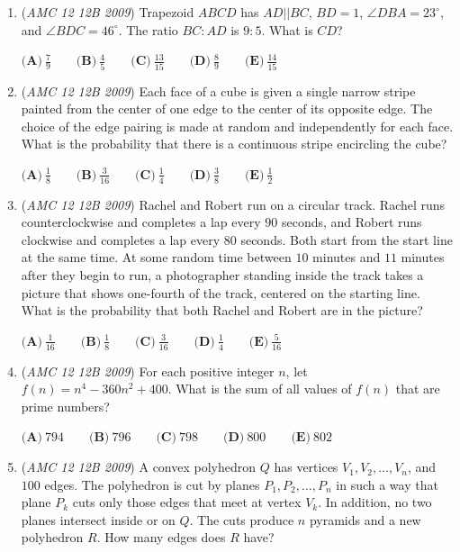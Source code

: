 \begin{enumerate}
 $\textbf{(A)}\ 3(1 + r)^x = 7\qquad \textbf{(B)}\ 3(1 + r/10)^x = 7\qquad \textbf{(C)}\ 3(1 + 2r)^x = 7$
$\textbf{(D)}\ 3(1 + \sqrt {r})^x = 7\qquad \textbf{(E)}\ 3(1 + 1/r)^x = 7$


	\item (\textit{AMC 12 12B 2009}) Trapezoid $ABCD$ has $AD||BC$, $BD = 1$, $\angle DBA = 23^{\circ}$, and $\angle BDC = 46^{\circ}$.  The ratio $BC: AD$ is $9: 5$.  What is $CD$?


 $\textbf{(A)}\ \frac {7}{9}\qquad \textbf{(B)}\ \frac {4}{5}\qquad \textbf{(C)}\ \frac {13}{15} \qquad \textbf{(D)}\ \frac {8}{9}\qquad \textbf{(E)}\ \frac {14}{15}$


	\item (\textit{AMC 12 12B 2009}) Each face of a cube is given a single narrow stripe painted from the center of one edge to the center of its opposite edge.  The choice of the edge pairing is made at random and independently for each face.  What is the probability that there is a continuous stripe encircling the cube?


 $\textbf{(A)}\ \frac {1}{8}\qquad \textbf{(B)}\ \frac {3}{16}\qquad \textbf{(C)}\ \frac {1}{4} \qquad \textbf{(D)}\ \frac {3}{8}\qquad \textbf{(E)}\ \frac {1}{2}$


	\item (\textit{AMC 12 12B 2009}) Rachel and Robert run on a circular track. Rachel runs counterclockwise and completes a lap every $90$ seconds, and Robert runs clockwise and completes a lap every $80$ seconds. Both start from the start line at the same time. At some random time between $10$ minutes and $11$ minutes after they begin to run, a photographer standing inside the track takes a picture that shows one-fourth of the track, centered on the starting line. What is the probability that both Rachel and Robert are in the picture?


 $\textbf{(A)}\ \frac {1}{16}\qquad \textbf{(B)}\ \frac18\qquad \textbf{(C)}\ \frac {3}{16} \qquad \textbf{(D)}\ \frac14\qquad \textbf{(E)}\ \frac {5}{16}$


	\item (\textit{AMC 12 12B 2009}) For each positive integer $n$, let $f(n) = n^4 - 360n^2 + 400$. What is the sum of all values of $f(n)$ that are prime numbers?


 $\textbf{(A)}\ 794\qquad \textbf{(B)}\ 796\qquad \textbf{(C)}\ 798\qquad \textbf{(D)}\ 800\qquad \textbf{(E)}\ 802$


	\item (\textit{AMC 12 12B 2009}) A convex polyhedron $Q$ has vertices $V_1,V_2,\ldots,V_n$, and $100$ edges. The polyhedron is cut by planes $P_1,P_2,\ldots,P_n$ in such a way that plane $P_k$ cuts only those edges that meet at vertex $V_k$. In addition, no two planes intersect inside or on $Q$. The cuts produce $n$ pyramids and a new polyhedron $R$. How many edges does $R$ have?



\end{enumerate}
